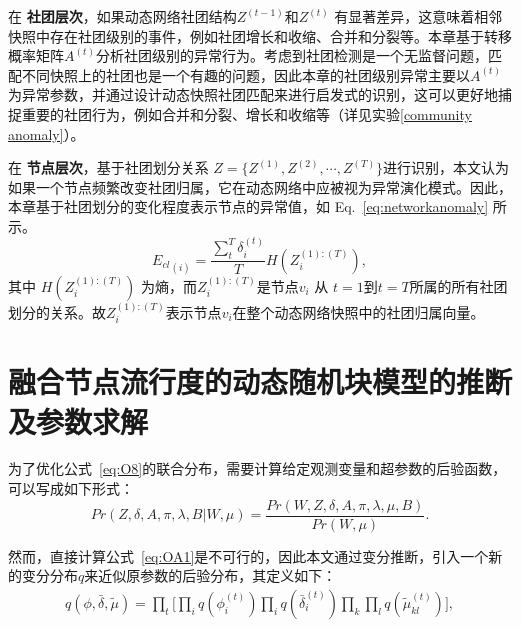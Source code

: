 在 \textbf{社团层次}，如果动态网络社团结构$Z^{(t-1)}$和$Z^{(t)}$ 有显著差异，这意味着相邻快照中存在社团级别的事件，例如社团增长和收缩、合并和分裂等。本章基于转移概率矩阵$A^{(t)}$分析社团级别的异常行为。考虑到社团检测是一个无监督问题，匹配不同快照上的社团也是一个有趣的问题，因此本章的社团级别异常主要以$A^{(t)}$为异常参数，并通过设计动态快照社团匹配来进行启发式的识别，这可以更好地捕捉重要的社团行为，例如合并和分裂、增长和收缩等（详见实验\ref{community anomaly}）。

在 \textbf{节点层次}，基于社团划分关系 $Z = \{ Z^{(1)}, Z^{(2)}, \cdots, Z^{(T)} \}$进行识别，本文认为如果一个节点频繁改变社团归属，它在动态网络中应被视为异常演化模式。因此，本章基于社团划分的变化程度表示节点的异常值，如 Eq.~\ref{eq:networkanomaly} 所示。
\begin{equation}
    {E_{cl}}_{(i)} = \frac{\sum_t^T \delta_i^{(t)}}{T} H(Z_i^{(1):(T)}),
\label{eq:networkanomaly}
\end{equation}
其中 $H(Z_i^{(1):(T)})$ 为熵，而$Z_i^{(1):(T)}$是节点$v_i$ 从 $t=1$到$t=T$所属的所有社团划分的关系。故$Z_i^{(1):(T)}$表示节点$v_i$在整个动态网络快照中的社团归属向量。


\section{融合节点流行度的动态随机块模型的推断及参数求解}
\label{sec4:inference}
为了优化公式~\ref{eq:O8}的联合分布，需要计算给定观测变量和超参数的后验函数，可以写成如下形式：
\begin{equation}
Pr(Z,\delta, A, \pi, \lambda, B | W, \mu) =
\frac{Pr(W, Z,\delta, A, \pi, \lambda, \mu, B)}{Pr( W, \mu)}.
\label{eq:OA1}
\end{equation}

然而，直接计算公式~\ref{eq:OA1}是不可行的，因此本文通过变分推断，引入一个新的变分分布$q$来近似原参数的后验分布，其定义如下：
\begin{equation}
\begin{split}
q(\phi,\bar{\delta}, \tilde{\mu}) = \prod_t \Big[ \prod_i q(\phi_i^{(t)}) \prod_i q(\bar{\delta}_i^{(t)}) \prod_k \prod_l q(\tilde{\mu}_{kl}^{(t)}) \Big],
\end{split}
\label{qfunc}
\end{equation}

